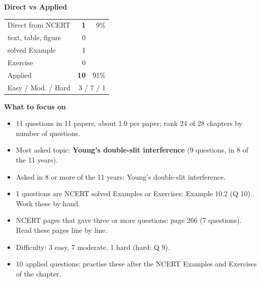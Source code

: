 \begin{minipage}[t]{0.34\linewidth}{\small\textbf{\color{crimson}Direct vs Applied}\par\smallskip
\begin{tabular}{@{}lrr@{}}\toprule
Direct from NCERT & \textbf{1} & 9\%\\
\quad text, table, figure & 0 &\\
\quad solved Example & 1 &\\
\quad Exercise & 0 &\\
Applied & \textbf{10} & 91\%\\\midrule
Easy / Mod. / Hard & \multicolumn{2}{r}{3 / 7 / 1}\\\bottomrule
\end{tabular}}\end{minipage}\hfill
\begin{minipage}[t]{0.63\linewidth}{\small\textbf{\color{crimson}What to focus on}\par\smallskip
\begin{itemize}[leftmargin=1.1em,itemsep=1pt,topsep=0pt]
\item 11 questions in 11 papers, about 1.0 per paper; rank 24 of 28 chapters by number of questions.
\item Most asked topic: \textbf{Young's double-slit interference} (9 questions, in 8 of the 11 years).
\item Asked in 8 or more of the 11 years: Young's double-slit interference.
\item 1 questions are NCERT solved Examples or Exercises: Example 10.2 (Q 10). Work these by hand.
\item NCERT pages that gave three or more questions: page 266 (7 questions). Read these pages line by line.
\item Difficulty: 3 easy, 7 moderate, 1 hard (hard: Q 9).
\item 10 applied questions: practise these after the NCERT Examples and Exercises of the chapter.
\end{itemize}}\end{minipage}\par
{}
